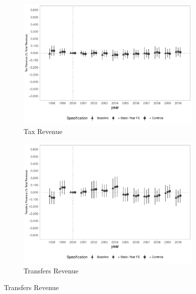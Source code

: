 \begin{figure}[h]
    \begin{center}
    \caption{Causal Effects on Revenues (\% of Total Revenue)}\label{fig:revenue2}
    \begin{subfigure}{0.32\textwidth}
        \centering
        \caption{\scriptsize Tax Revenue}\label{fig:rev2_a}
        \includegraphics[width=\textwidth]{plots/spending/finbra_rectribut_share_dist_ec29_baseline_dist_ec29_baseline_full.pdf}
    \end{subfigure}
    \begin{subfigure}{0.32\textwidth}
        \centering
        \caption{\scriptsize Transfers Revenue}\label{fig:rev2_b}
        \includegraphics[width=\textwidth]{plots/spending/finbra_rectransf_share_dist_ec29_baseline_dist_ec29_baseline_full.pdf}

\end{subfigure}
\end{center}
\end{figure}
